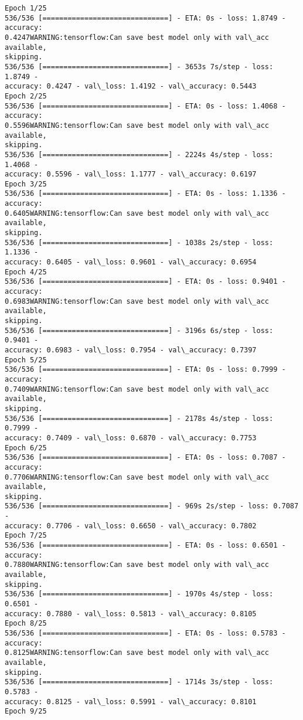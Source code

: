\documentclass[11pt]{article}
\begin{document}
    \begin{Verbatim}[commandchars=\\\{\}]
Epoch 1/25
536/536 [==============================] - ETA: 0s - loss: 1.8749 - accuracy:
0.4247WARNING:tensorflow:Can save best model only with val\_acc available,
skipping.
536/536 [==============================] - 3653s 7s/step - loss: 1.8749 -
accuracy: 0.4247 - val\_loss: 1.4192 - val\_accuracy: 0.5443
Epoch 2/25
536/536 [==============================] - ETA: 0s - loss: 1.4068 - accuracy:
0.5596WARNING:tensorflow:Can save best model only with val\_acc available,
skipping.
536/536 [==============================] - 2224s 4s/step - loss: 1.4068 -
accuracy: 0.5596 - val\_loss: 1.1777 - val\_accuracy: 0.6197
Epoch 3/25
536/536 [==============================] - ETA: 0s - loss: 1.1336 - accuracy:
0.6405WARNING:tensorflow:Can save best model only with val\_acc available,
skipping.
536/536 [==============================] - 1038s 2s/step - loss: 1.1336 -
accuracy: 0.6405 - val\_loss: 0.9601 - val\_accuracy: 0.6954
Epoch 4/25
536/536 [==============================] - ETA: 0s - loss: 0.9401 - accuracy:
0.6983WARNING:tensorflow:Can save best model only with val\_acc available,
skipping.
536/536 [==============================] - 3196s 6s/step - loss: 0.9401 -
accuracy: 0.6983 - val\_loss: 0.7954 - val\_accuracy: 0.7397
Epoch 5/25
536/536 [==============================] - ETA: 0s - loss: 0.7999 - accuracy:
0.7409WARNING:tensorflow:Can save best model only with val\_acc available,
skipping.
536/536 [==============================] - 2178s 4s/step - loss: 0.7999 -
accuracy: 0.7409 - val\_loss: 0.6870 - val\_accuracy: 0.7753
Epoch 6/25
536/536 [==============================] - ETA: 0s - loss: 0.7087 - accuracy:
0.7706WARNING:tensorflow:Can save best model only with val\_acc available,
skipping.
536/536 [==============================] - 969s 2s/step - loss: 0.7087 -
accuracy: 0.7706 - val\_loss: 0.6650 - val\_accuracy: 0.7802
Epoch 7/25
536/536 [==============================] - ETA: 0s - loss: 0.6501 - accuracy:
0.7880WARNING:tensorflow:Can save best model only with val\_acc available,
skipping.
536/536 [==============================] - 1970s 4s/step - loss: 0.6501 -
accuracy: 0.7880 - val\_loss: 0.5813 - val\_accuracy: 0.8105
Epoch 8/25
536/536 [==============================] - ETA: 0s - loss: 0.5783 - accuracy:
0.8125WARNING:tensorflow:Can save best model only with val\_acc available,
skipping.
536/536 [==============================] - 1714s 3s/step - loss: 0.5783 -
accuracy: 0.8125 - val\_loss: 0.5991 - val\_accuracy: 0.8101
Epoch 9/25

\end{Verbatim}
\end{document}

